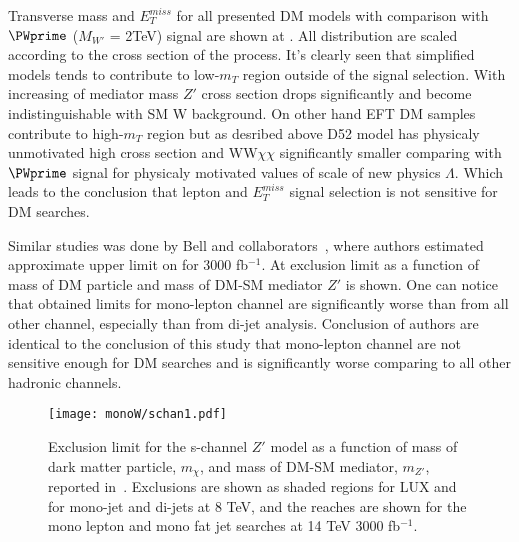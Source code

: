 Transverse mass and $E_{T}^{miss}$ for all presented DM models with comparison with $\PWprime$ ($M_{W'}$ = 2TeV) signal are shown at .
All distribution are scaled according to the cross section of the process. It's clearly seen that simplified models tends to contribute to low-$m_{T}$ region
outside of the signal selection. With increasing of mediator mass $Z'$ cross section drops significantly and become indistinguishable with SM W background.
On other hand EFT DM samples contribute to high-$m_{T}$ region but as desribed above D52 model has physicaly unmotivated high cross section and WW$\chi\chi$ 
significantly smaller comparing with $\PWprime$ signal for physicaly motivated values of scale of new physics $\Lambda$. Which leads to the conclusion that
lepton and $E_{T}^{miss}$ signal selection is not sensitive for DM searches.



Similar studies was done by Bell and collaborators~\cite{arXiv:1512.00476}, where authors estimated approximate upper limit on for 3000 fb$^{-1}$. 
At  exclusion limit
as a function of mass of DM particle and mass of DM-SM mediator $Z'$ is shown. One can notice that obtained limits for mono-lepton channel are significantly 
worse than from all other channel, especially than from di-jet analysis. Conclusion of authors are identical to the conclusion of this study that mono-lepton channel
are not sensitive enough for DM searches and is significantly worse comparing to all other hadronic channels.

\begin{figure}[hb]
 \texttt{[image: monoW/schan1.pdf]}
  \caption{Exclusion limit for the s-channel $Z'$ model as a function of mass of dark matter particle, $m_{\chi}$, 
  and mass of DM-SM mediator, $m_{Z'}$, reported in~\cite{arXiv:1512.00476}.
  Exclusions are shown as shaded regions for LUX and for mono-jet and di-jets at 8 TeV, 
  and the reaches are shown for the mono lepton and mono fat jet searches at 14 TeV 3000 fb$^{-1}$.}
  \label{fig:bellExclLim}
\end{figure}
